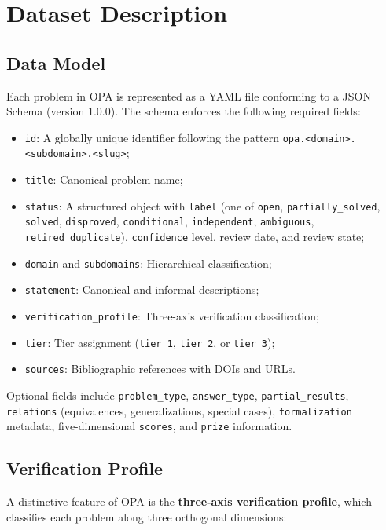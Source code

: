 \documentclass[11pt]{article}
\begin{document}
\section{Dataset Description}
\label{sec:dataset}

\subsection{Data Model}

Each problem in OPA is represented as a YAML file conforming to a JSON Schema (version 1.0.0).
The schema enforces the following required fields:

\begin{itemize}  \item \texttt{id}: A globally unique identifier following the pattern \texttt{opa.<domain>.<subdomain>.<slug>};
  \item \texttt{title}: Canonical problem name;
  \item \texttt{status}: A structured object with \texttt{label} (one of \texttt{open}, \texttt{partially\_solved}, \texttt{solved}, \texttt{disproved}, \texttt{conditional}, \texttt{independent}, \texttt{ambiguous}, \texttt{retired\_duplicate}), \texttt{confidence} level, review date, and review state;
  \item \texttt{domain} and \texttt{subdomains}: Hierarchical classification;
  \item \texttt{statement}: Canonical and informal descriptions;
  \item \texttt{verification\_profile}: Three-axis verification classification;
  \item \texttt{tier}: Tier assignment (\texttt{tier\_1}, \texttt{tier\_2}, or \texttt{tier\_3});
  \item \texttt{sources}: Bibliographic references with DOIs and URLs.
\end{itemize}

Optional fields include \texttt{problem\_type}, \texttt{answer\_type}, \texttt{partial\_results}, \texttt{relations} (equivalences, generalizations, special cases), \texttt{formalization} metadata, five-dimensional \texttt{scores}, and \texttt{prize} information.

\subsection{Verification Profile}
\label{sec:verif-profile}

A distinctive feature of OPA is the \textbf{three-axis verification profile}, which classifies each problem along three orthogonal dimensions:
\end{document}
